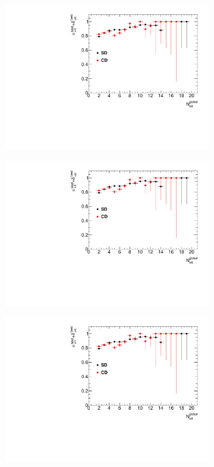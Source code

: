 \begin{figure}[H]
{		\begin{subfigure}[b]{\linewidth}{
				{\includegraphics[width=\linewidth, page=10]{graphics/vertexing/vertexEffi.pdf}}}
		\end{subfigure}
	}
	\quad
	\parbox{0.3\textwidth}{
		\centering
		\begin{subfigure}[b]{\linewidth}{
				{\includegraphics[width=\linewidth, page=13]{graphics/vertexing/vertexEffi.pdf}}}
		\end{subfigure}
	}
	\parbox{0.3\textwidth}{
			\centering
			\begin{subfigure}[b]{\linewidth}{
					{\includegraphics[width=\linewidth, page=16]{graphics/vertexing/vertexEffi.pdf}}}

\end{subfigure}}
\end{figure}
